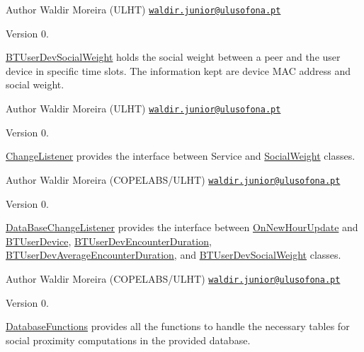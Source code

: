 \begin{DoxyAuthor}{Author}
Waldir Moreira (U\+L\+H\+T) \href{mailto:waldir.junior@ulusofona.pt}{\tt waldir.\+junior@ulusofona.\+pt}
\end{DoxyAuthor}
\begin{DoxyVersion}{Version}
0.
\end{DoxyVersion}
\hyperlink{classcom_1_1social_1_1proximity_1_1_b_t_user_dev_social_weight}{B\+T\+User\+Dev\+Social\+Weight} holds the social weight between a peer and the user device in specific time slots. The information kept are device M\+A\+C address and social weight.

\begin{DoxyAuthor}{Author}
Waldir Moreira (U\+L\+H\+T) \href{mailto:waldir.junior@ulusofona.pt}{\tt waldir.\+junior@ulusofona.\+pt}
\end{DoxyAuthor}
\begin{DoxyVersion}{Version}
0.
\end{DoxyVersion}
\hyperlink{interfacecom_1_1social_1_1proximity_1_1_change_listener}{Change\+Listener} provides the interface between Service and \hyperlink{classcom_1_1social_1_1proximity_1_1_social_weight}{Social\+Weight} classes.

\begin{DoxyAuthor}{Author}
Waldir Moreira (C\+O\+P\+E\+L\+A\+B\+S/\+U\+L\+H\+T) \href{mailto:waldir.junior@ulusofona.pt}{\tt waldir.\+junior@ulusofona.\+pt}
\end{DoxyAuthor}
\begin{DoxyVersion}{Version}
0.
\end{DoxyVersion}
\hyperlink{interfacecom_1_1social_1_1proximity_1_1_data_base_change_listener}{Data\+Base\+Change\+Listener} provides the interface between \hyperlink{classcom_1_1social_1_1proximity_1_1_on_new_hour_update}{On\+New\+Hour\+Update} and \hyperlink{classcom_1_1social_1_1proximity_1_1_b_t_user_device}{B\+T\+User\+Device}, \hyperlink{classcom_1_1social_1_1proximity_1_1_b_t_user_dev_encounter_duration}{B\+T\+User\+Dev\+Encounter\+Duration}, \hyperlink{classcom_1_1social_1_1proximity_1_1_b_t_user_dev_average_encounter_duration}{B\+T\+User\+Dev\+Average\+Encounter\+Duration}, and \hyperlink{classcom_1_1social_1_1proximity_1_1_b_t_user_dev_social_weight}{B\+T\+User\+Dev\+Social\+Weight} classes.

\begin{DoxyAuthor}{Author}
Waldir Moreira (C\+O\+P\+E\+L\+A\+B\+S/\+U\+L\+H\+T) \href{mailto:waldir.junior@ulusofona.pt}{\tt waldir.\+junior@ulusofona.\+pt}
\end{DoxyAuthor}
\begin{DoxyVersion}{Version}
0.
\end{DoxyVersion}
\hyperlink{classcom_1_1social_1_1proximity_1_1_database_functions}{Database\+Functions} provides all the functions to handle the necessary tables for social proximity computations in the provided database.

